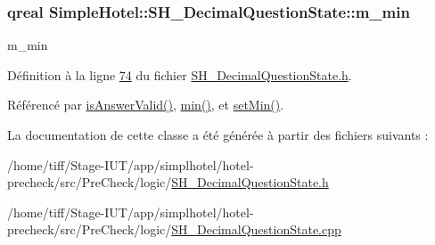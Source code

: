 \hypertarget{classSimpleHotel_1_1SH__DecimalQuestionState_a412de5c017845e82252a280ac918e11b}{
\subsubsection[{m\-\_\-min}]{\setlength{\rightskip}{0pt plus 5cm}qreal Simple\-Hotel\-::\-S\-H\-\_\-\-Decimal\-Question\-State\-::m\-\_\-min\hspace{0.3cm}{\ttfamily [private]}}}\label{classSimpleHotel_1_1SH__DecimalQuestionState_a412de5c017845e82252a280ac918e11b}


m\-\_\-min 



Définition à la ligne \hyperlink{SH__DecimalQuestionState_8h_source_l00074}{74} du fichier \hyperlink{SH__DecimalQuestionState_8h_source}{S\-H\-\_\-\-Decimal\-Question\-State.\-h}.



Référencé par \hyperlink{classSimpleHotel_1_1SH__DecimalQuestionState_a1693d6f6026fcc17866c9c90e235bd64}{is\-Answer\-Valid()}, \hyperlink{classSimpleHotel_1_1SH__DecimalQuestionState_a16a881ee4e99b6a02a07cff533c9c82c}{min()}, et \hyperlink{classSimpleHotel_1_1SH__DecimalQuestionState_adb78c98d2b895cf8a89224c84aab3d0b}{set\-Min()}.



La documentation de cette classe a été générée à partir des fichiers suivants \-:\begin{DoxyCompactItemize}
\item 
/home/tiff/\-Stage-\/\-I\-U\-T/app/simplhotel/hotel-\/precheck/src/\-Pre\-Check/logic/\hyperlink{SH__DecimalQuestionState_8h}{S\-H\-\_\-\-Decimal\-Question\-State.\-h}\item 
/home/tiff/\-Stage-\/\-I\-U\-T/app/simplhotel/hotel-\/precheck/src/\-Pre\-Check/logic/\hyperlink{SH__DecimalQuestionState_8cpp}{S\-H\-\_\-\-Decimal\-Question\-State.\-cpp}\end{DoxyCompactItemize}
